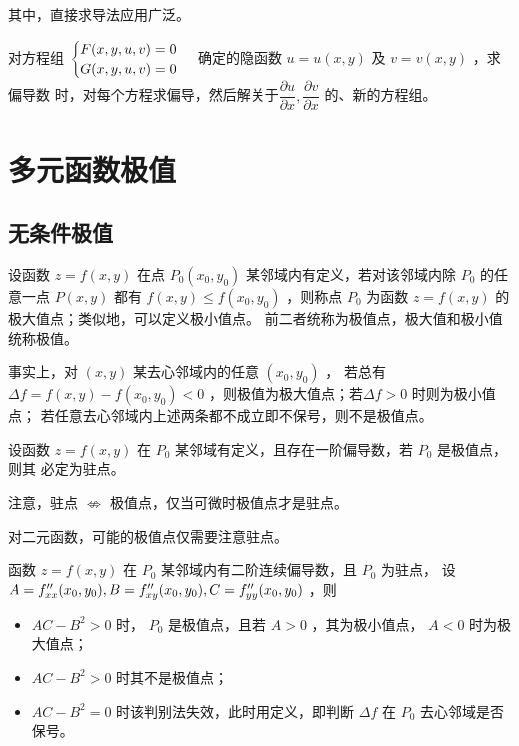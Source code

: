 其中，直接求导法应用广泛。

对方程组 $ \displaystyle \begin{cases}
    F(x,y,u,v) = 0 \\ G(x,y,u,v) = 0
\end{cases} $ 确定的隐函数 $ u = u(x,y) $ 及 $ v = v(x,y) $ ，求偏导数
时，对每个方程求偏导，然后解关于$ \dfrac{\partial u}{\partial x},\dfrac{\partial v}{\partial x} $ 的、新的方程组。


\section{多元函数极值}

\subsection{无条件极值}

\begin{Def}[无条件极值]
    
    设函数 $ z = f(x,y) $ 在点 $ P_0(x_0,y_0) $ 某邻域内有定义，若对该邻域内除 $ P_0 $ 的任意一点 $ P(x,y) $ 
    都有 $ f(x,y)\leq f(x_0,y_0) $ ，则称点 $ P_0 $ 为函数 $ z = f(x,y) $ 的极大值点；类似地，可以定义极小值点。
    前二者统称为极值点，极大值和极小值统称极值。
\end{Def}

事实上，对 $ (x,y) $ 某去心邻域内的任意 $ (x_0,y_0) $ ，
若总有 $ \Delta f = f(x,y) - f(x_0,y_0) < 0 $ ，则极值为极大值点；若$ \Delta f > 0 $ 时则为极小值点；
若任意去心邻域内上述两条都不成立即不保号，则不是极值点。
    
\begin{Theo}[二元函数极值存在的必要条件]

    设函数 $ z = f(x,y) $ 在 $ P_0 $ 某邻域有定义，且存在一阶偏导数，若 $ P_0 $ 是极值点，则其
    必定为驻点。
\end{Theo}

注意，驻点 $ \nLeftrightarrow $ 极值点，仅当可微时极值点才是驻点。

对二元函数，可能的极值点仅需要注意驻点。

\begin{Theo}[二元函数极值存在的充分条件]

    函数 $ z = f(x,y) $ 在 $ P_0 $ 某邻域内有二阶连续偏导数，且 $ P_0 $ 为驻点，
    设 $ A = f^{\prime\prime}_{xx}(x_0,y_0),B = f^{\prime\prime}_{xy}(x_0,y_0),C = f^{\prime\prime}_{yy}(x_0,y_0) $ ，则
    \begin{itemize}
        \item $ AC - B^2 > 0 $ 时， $ P_0 $ 是极值点，且若 $ A>0 $ ，其为极小值点，
        $ A<0 $ 时为极大值点；
        \item $ AC-B^2>0 $ 时其不是极值点；
        \item $ AC-B^2 = 0 $ 时该判别法失效，此时用定义，即判断 $ \Delta f $ 在
        $ P_0 $ 去心邻域是否保号。
    \end{itemize}
\end{Theo}

